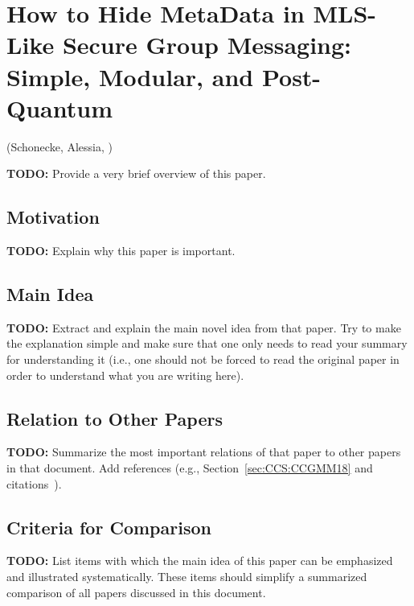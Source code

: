 \section{How to Hide MetaData in MLS-Like Secure Group Messaging: Simple, Modular, and Post-Quantum}
\label{sec:CCS:HasKatPre22}
(Schonecke, Alessia, \cite{CCS:HasKatPre22,EPRINT:HasKatPre22})

\alert{\textbf{TODO:} Provide a very brief overview of this paper.}

\subsection{Motivation}
\alert{\textbf{TODO:} Explain why this paper is important.}

\subsection{Main Idea}
\alert{\textbf{TODO:} Extract and explain the main novel idea from that paper. Try to make the explanation simple and make sure that one only needs to read your summary for understanding it (i.e., one should not be forced to read the original paper in order to understand what you are writing here).}

\subsection{Relation to Other Papers}
\alert{\textbf{TODO:} Summarize the most important relations of that paper to other papers in that document. Add references (e.g., Section~\ref{sec:CCS:CCGMM18} and citations~\cite{CCS:CCGMM18}).}

\subsection{Criteria for Comparison}
\alert{\textbf{TODO:} List items with which the main idea of this paper can be emphasized and illustrated systematically. These items should simplify a summarized comparison of all papers discussed in this document.}